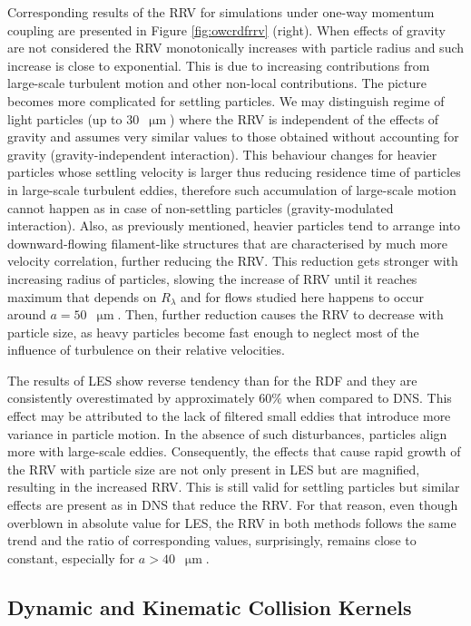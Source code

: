 \documentclass{pracamgren}
\begin{document}
Corresponding results of the RRV for simulations under one-way momentum coupling are presented in Figure \ref{fig:owcrdfrrv} (right).
When effects of gravity are not considered the RRV monotonically increases with particle radius and such increase is close to exponential.
This is due to increasing contributions from large-scale turbulent motion and other non-local contributions.
The picture becomes more complicated for settling particles.
We may distinguish regime of light particles (up to $30$~$\upmu\text{m}$) where the RRV is independent of the effects of gravity and assumes very similar values to those obtained without accounting for gravity (gravity-independent interaction).
This behaviour changes for heavier particles whose settling velocity is larger thus reducing residence time of particles in large-scale turbulent eddies, therefore such accumulation of large-scale motion cannot happen as in case of non-settling particles (gravity-modulated interaction).
Also, as previously mentioned, heavier particles tend to arrange into downward-flowing filament-like structures that are characterised by much more velocity correlation, further reducing the RRV.
This reduction gets stronger with increasing radius of particles, slowing the increase of RRV until it reaches maximum that depends on $R_{\lambda}$ \parencite{Rosa2013} and for flows studied here happens to occur around $a = 50$~$\upmu\text{m}$.
Then, further reduction causes the RRV to decrease with particle size, as heavy particles become fast enough to neglect most of the influence of turbulence on their relative velocities.

The results of LES show reverse tendency than for the RDF and they are consistently overestimated by approximately $60 \%$ when compared to DNS.
This effect may be attributed to the lack of filtered small eddies that introduce more variance in particle motion.
In the absence of such disturbances, particles align more with large-scale eddies.
Consequently, the effects that cause rapid growth of the RRV with particle size are not only present in LES but are magnified, resulting in the increased RRV.
This is still valid for settling particles but similar effects are present as in DNS that reduce the RRV.
For that reason, even though overblown in absolute value for LES, the RRV in both methods follows the same trend and the ratio of corresponding values, surprisingly, remains close to constant, especially for $a > 40$~$\upmu\text{m}$.     



\subsection{Dynamic and Kinematic Collision Kernels}
\label{ssc:ch2.coll.gamma}
\end{document}
